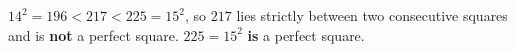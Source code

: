 $14^2=196<217<225=15^2$, so $217$ lies strictly between two consecutive squares and is \textbf{not} a perfect square. $225=15^2$ \textbf{is} a perfect square.
